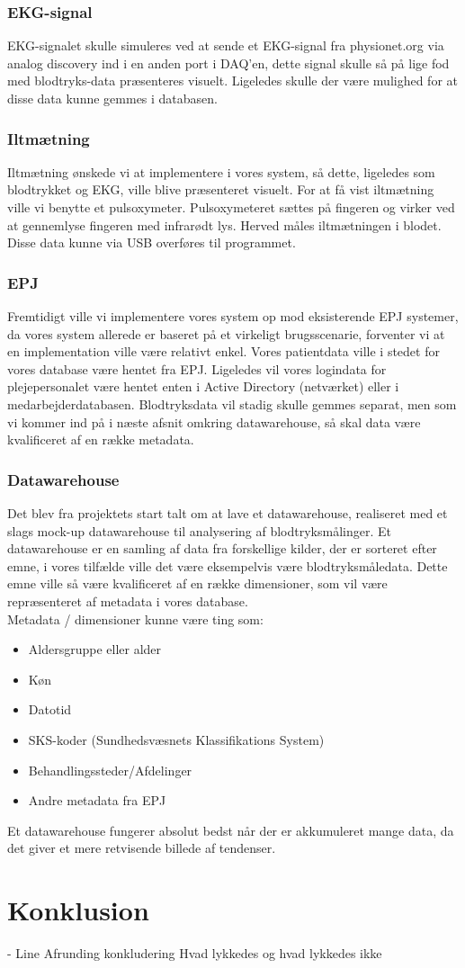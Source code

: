 \subsection{EKG-signal}
EKG-signalet skulle  simuleres ved at sende et EKG-signal fra physionet.org via analog discovery ind i en anden port i DAQ’en, dette signal skulle så på lige fod med blodtryks-data præsenteres visuelt. Ligeledes skulle der være mulighed for at disse data kunne gemmes i databasen.
\subsection{Iltmætning}
Iltmætning ønskede vi at implementere i vores system, så dette, ligeledes som blodtrykket og EKG, ville blive præsenteret visuelt. For at få vist iltmætning ville vi benytte et pulsoxymeter. Pulsoxymeteret sættes på fingeren og virker ved at gennemlyse fingeren med infrarødt lys. Herved måles iltmætningen i blodet. Disse data kunne via USB overføres til programmet. 
\subsection{EPJ}
Fremtidigt ville vi implementere vores system op mod eksisterende EPJ systemer, da vores system allerede er baseret på et virkeligt brugsscenarie, forventer vi at en implementation ville være relativt enkel. Vores patientdata ville i stedet for vores database være hentet fra EPJ.  Ligeledes vil vores logindata for plejepersonalet være hentet enten i Active Directory (netværket) eller i medarbejderdatabasen. Blodtryksdata vil stadig skulle gemmes separat, men som vi kommer ind på i næste afsnit omkring datawarehouse, så skal data være kvalificeret af en række metadata.
\subsection{Datawarehouse}
Det blev fra projektets start talt om at lave et datawarehouse, realiseret med et slags mock-up datawarehouse til analysering af blodtryksmålinger. Et datawarehouse er en samling af data fra forskellige kilder, der er sorteret efter emne, i vores tilfælde ville det være eksempelvis være blodtryksmåledata. Dette emne ville så være kvalificeret af en række dimensioner, som vil være repræsenteret af metadata i vores database.\\ 
Metadata / dimensioner kunne være ting som:
\begin{itemize}
\item Aldersgruppe eller alder
\item Køn
\item Datotid
\item SKS-koder (Sundhedsvæsnets Klassifikations System)
\item Behandlingssteder/Afdelinger
\item Andre metadata fra EPJ
\end{itemize}
Et datawarehouse fungerer absolut bedst når der er akkumuleret mange data, da det giver et mere retvisende billede af tendenser. 
\chapter{Konklusion}
- Line
Afrunding
konkludering
Hvad lykkedes og hvad lykkedes ikke